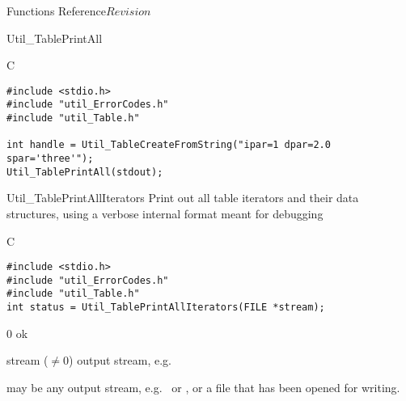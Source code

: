 \begin{cactuspart}{ Functions Reference}{}{$Revision$}
\begin{FunctionDescription}{Util\_TablePrintAll}

\begin{ExampleSection}
\begin{Example}{C}
\begin{verbatim}
#include <stdio.h>
#include "util_ErrorCodes.h"
#include "util_Table.h"

int handle = Util_TableCreateFromString("ipar=1 dpar=2.0 spar='three'");
Util_TablePrintAll(stdout);
\end{verbatim}
\end{Example}
\end{ExampleSection}
\end{FunctionDescription}


\begin{FunctionDescription}{Util\_TablePrintAllIterators}
\label{Util-TablePrintAllIterators}
Print out all table iterators and their data structures, using a
verbose internal format meant for debugging

\begin{SynopsisSection}
\begin{Synopsis}{C}
\begin{verbatim}
#include <stdio.h>
#include "util_ErrorCodes.h"
#include "util_Table.h"
int status = Util_TablePrintAllIterators(FILE *stream);
\end{verbatim}
\end{Synopsis}
\end{SynopsisSection}

\begin{ResultSection}
\begin{Result}{\rm 0}
ok
\end{Result}
\end{ResultSection}

\begin{ParameterSection}
\begin{Parameter}{stream ($\ne 0$)}
output stream, e.g.\ 
\end{Parameter}
\end{ParameterSection}

\begin{Discussion}
 may be any output stream, e.g.\  or
, or a file that has been opened for writing.
\end{Discussion}


\end{FunctionDescription}
\end{cactuspart}
